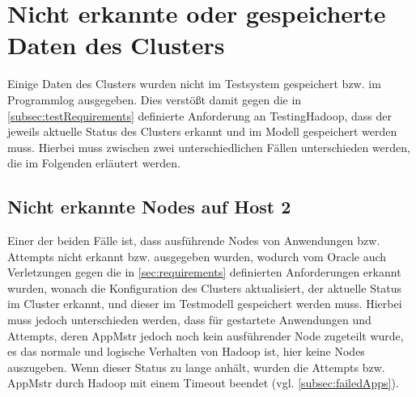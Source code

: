 \section{Nicht erkannte oder gespeicherte Daten des Clusters}
\label{sec:notDetectedData}

Einige Daten des Clusters wurden nicht im Testsystem gespeichert bzw. im Programmlog ausgegeben.
Dies verstößt damit gegen die in \cref{subsec:testRequirements} definierte Anforderung an TestingHadoop, dass der jeweils aktuelle Status des Clusters erkannt und im Modell gespeichert werden muss.
Hierbei muss zwischen zwei unterschiedlichen Fällen unterschieden werden, die im Folgenden erläutert werden.

\subsection{Nicht erkannte Nodes auf Host 2}
\label{subsec:notDetectedHost2}

Einer der beiden Fälle ist, dass ausführende Nodes von Anwendungen bzw. Attempts nicht erkannt bzw. ausgegeben wurden, wodurch vom Oracle auch Verletzungen gegen die in \cref{sec:requirements} definierten Anforderungen erkannt wurden, wonach die Konfiguration des Clusters aktualisiert, der aktuelle Status im Cluster erkannt, und dieser im Testmodell gespeichert werden muss.
Hierbei muss jedoch unterschieden werden, dass für gestartete Anwendungen und Attempts, deren \gls{AppMstr} jedoch noch kein ausführender Node zugeteilt wurde, es das normale und logische Verhalten von Hadoop ist, hier keine Nodes auszugeben.
Wenn dieser Status zu lange anhält, wurden die Attempts bzw. \gls{AppMstr} durch Hadoop mit einem Timeout beendet (vgl. \cref{subsec:failedApps}).

